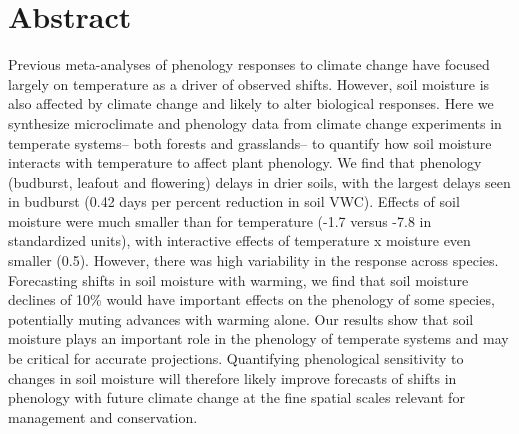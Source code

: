 \documentclass{article}
\begin{document}








\linenumbers

\section*{Abstract}
Previous meta-analyses of phenology responses to climate change have focused largely on temperature as a driver of observed shifts. However, soil moisture is also affected by climate change and likely to alter biological responses. Here we synthesize microclimate and phenology data from climate change experiments in temperate systems-- both forests and grasslands-- to quantify how soil moisture interacts with temperature to affect plant phenology. 
We find that phenology (budburst, leafout and flowering) delays in drier soils, with the largest delays seen in budburst (0.42 days per percent reduction in soil VWC). Effects of soil moisture were much smaller than for temperature (-1.7 versus -7.8 in standardized units), with interactive effects of temperature x moisture even smaller (0.5). However, there was high variability in the response across species. Forecasting shifts in soil moisture with warming, we find that soil moisture declines of 10\% would have important effects on the phenology of some species, potentially muting advances with warming alone. Our results show that soil moisture plays an important role in the phenology of temperate systems and may be critical for accurate projections. Quantifying phenological sensitivity to changes in soil moisture will therefore likely improve forecasts of shifts in phenology with future climate change at the fine spatial scales relevant for management and conservation.


\newpage
\end{document}
